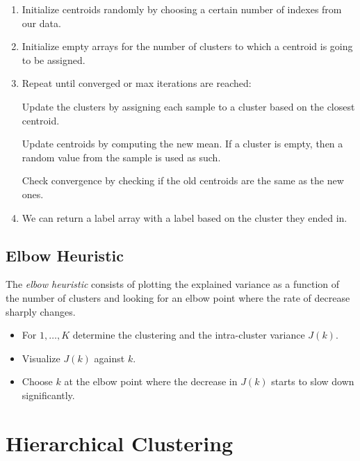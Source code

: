 \begin{enumerate}

	\item Initialize centroids randomly by choosing a certain number of indexes from our data.

	\item Initialize empty arrays for the number of clusters to which a centroid is going to be assigned.

	\item Repeat until converged or max iterations are reached:

	      \subitem Update the clusters by assigning each sample to a cluster based on the closest centroid.

	      \subitem Update centroids by computing the new mean. If a cluster is empty, then a random value from the sample is used as such.

	      \subitem Check convergence by checking if the old centroids are the same as the new ones.

	\item We can return a label array with a label based on the cluster they ended in.

\end{enumerate}

\subsection{Elbow Heuristic}

The \emph{elbow heuristic} consists of plotting the explained variance as a function of the number of clusters and looking for an elbow point
where the rate of decrease sharply changes.

\begin{itemize}

	\item For \(1, \dots, K\) determine the clustering and the intra-cluster variance \(J(k)\).

	\item Visualize \(J(k)\) against \(k\).

	\item Choose \(k\) at the elbow point where the decrease in \(J(k)\) starts to slow down significantly.

\end{itemize}

\section{Hierarchical Clustering}

